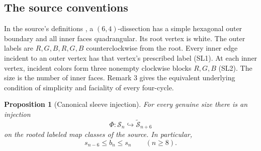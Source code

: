 \documentclass[11pt,letterpaper]{article}
\numberwithin{equation}{section}
\newtheorem{proposition}[theorem]{Proposition}
\theoremstyle{remark}\newtheorem{remark}[theorem]{Remark}
\begin{document}
\subsection{The source conventions}
In the source's definitions \cite[Section 2.1]{FNS}, a
$(6,4)$-dissection has a simple hexagonal outer boundary and all
inner faces quadrangular. Its root vertex is white. The outer labels
are $R,G,B,R,G,B$ counterclockwise from the root. Every inner edge
incident to an outer vertex has that vertex's prescribed label
(SL1). At each inner vertex, incident colors form three nonempty
clockwise blocks $R,G,B$ (SL2). The size is the number of inner faces.
Remark 3 gives the equivalent underlying condition of simplicity
and faciality of every four-cycle.

\begin{proposition}[Canonical sleeve injection]\label{cps:log:prop:sleeve}
For every genuine size there is an injection
\[
 \Phi:\mathcal S_n\hookrightarrow\widetilde{\mathcal S}_{n+6}
\]
on the rooted labeled map classes of the source. In particular,
\begin{equation}\label{cps:log:eq:sleeve-sandwich}
 s_{n-6}\le b_n\le s_n\qquad(n\ge8).
\end{equation}
\end{proposition}
\end{document}
